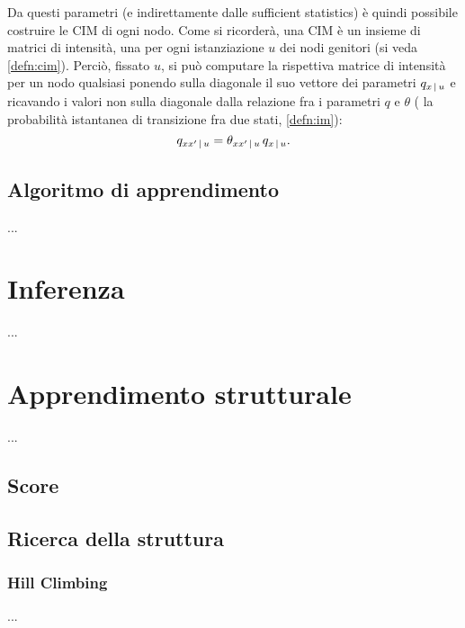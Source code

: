 Da questi parametri (e indirettamente dalle sufficient statistics) è quindi possibile costruire le \acl{CIM} di ogni nodo. Come si ricorderà, una \acs{CIM} è un insieme di matrici di intensità, una per ogni istanziazione $u$ dei nodi genitori (si veda \ref{defn:cim}). Perciò, fissato $u$, si può computare la rispettiva matrice di intensità per un nodo qualsiasi ponendo sulla diagonale il suo vettore dei parametri $q_{x\,\arrowvert\,u}$ e ricavando i valori non sulla diagonale dalla relazione fra i parametri $q$ e $\theta$ (\ie{} la probabilità istantanea di transizione fra due stati, \ref{defn:im}):
\[
q_{xx^\prime\,\arrowvert\,u}=\theta_{xx^\prime\,\arrowvert\,u}\,q_{x\,\arrowvert\,u}\text{.}
\]

\subsection{Algoritmo di apprendimento}
...

\section{Inferenza}
\label{sec:ctbn-inferenza}
...


\section{Apprendimento strutturale}
\label{sec:ctbn-apprendimento-strutturale}
...

\subsection{Score} %
\label{sec:ctbn-score}

\subsection{Ricerca della struttura}
\label{sec:ctbn-graph-search}

\subsubsection{Hill Climbing}
...


